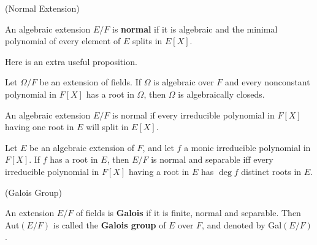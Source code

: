 \documentclass{article}
\begin{document}
\begin{definition}
    (Normal Extension)\par
    An algebraic extension $E/F$ is \textbf{normal} if it is algebraic and the minimal polynomial of every element of $E$ splits in $E[X]$.
\end{definition}

Here is an extra useful proposition.

\begin{proposition}
    Let $\Omega/F$ be an extension of fields. If $\Omega$ is algebraic over $F$ and every nonconstant polynomial in $F[X]$ has a root in $\Omega$, then $\Omega$ is algebraically closeds.    
\end{proposition}

\begin{proposition}
    An algebraic extension $E/F$ is normal if every irreducible polynomial in $F[X]$ having one root in $E$ will split in $E[X]$.
\end{proposition}

\begin{proposition}
    Let $E$ be an algebraic extension of $F$, and let $f$ a monic irreducible polynomial in $F[X]$. If $f$ has a root in $E$, then $E/F$ is normal and separable iff every irreducible polynomial in $F[X]$ having a root in $E$ has $\deg f$ distinct roots in $E$. 
\end{proposition}

\begin{definition}
    (Galois Group)\par
    An extension $E/F$ of fields is \textbf{Galois} if it is finite, normal and separable. Then Aut$(E/F)$ is called  the \textbf{Galois group} of $E$ over $F$, and denoted by Gal$(E/F)$.
\end{definition}
\end{document}

